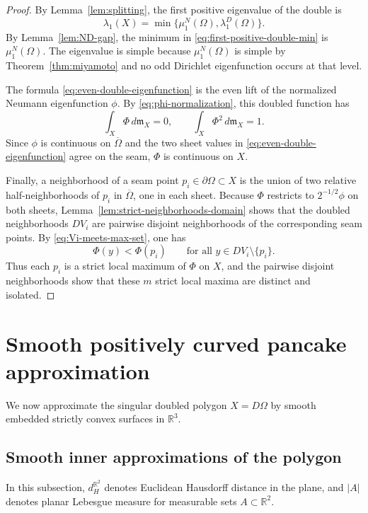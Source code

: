 \documentclass[11pt]{amsart}
\numberwithin{equation}{section}
\newcommand{\R}{\mathbb R}
\newcommand{\Om}{\Omega}
\newcommand{\mm}{\mathfrak m}
\begin{document}
\begin{proof}
By Lemma~\ref{lem:splitting}, the first positive eigenvalue of the double is
\begin{equation}\label{eq:first-positive-double-min}
\lambda_1(X)=\min\{\mu_1^N(\Om),\lambda_1^D(\Om)\}.
\end{equation}
By Lemma~\ref{lem:ND-gap}, the minimum in \eqref{eq:first-positive-double-min} is
$\mu_1^N(\Om)$.  The eigenvalue is simple because $\mu_1^N(\Om)$ is simple by
Theorem~\ref{thm:miyamoto} and no odd Dirichlet eigenfunction occurs at that
level.

The formula \eqref{eq:even-double-eigenfunction} is the even lift of the
normalized Neumann eigenfunction $\phi$.  By \eqref{eq:phi-normalization}, this
doubled function has
$$
\int_X\Phi\,d\mm_X=0,
\qquad
\int_X\Phi^2\,d\mm_X=1.
$$
Since $\phi$ is continuous on $\overline\Om$ and the two sheet values in
\eqref{eq:even-double-eigenfunction} agree on the seam, $\Phi$ is continuous on
$X$.

Finally, a neighborhood of a seam point $p_i\in\partial\Om\subset X$ is the union
of two relative half-neighborhoods of $p_i$ in $\overline\Om$, one in each sheet.
Because $\Phi$ restricts to $2^{-1/2}\phi$ on both sheets,
Lemma~\ref{lem:strict-neighborhoods-domain} shows that the doubled neighborhoods
$DV_i$ are pairwise disjoint neighborhoods of the corresponding seam points.  By
\eqref{eq:Vi-meets-max-set}, one has
$$
\Phi(y)<\Phi(p_i)
\qquad\text{for all }y\in D V_i\setminus\{p_i\}.
$$
Thus each $p_i$ is a strict local maximum of $\Phi$ on $X$, and the pairwise
disjoint neighborhoods show that these $m$ strict local maxima are distinct and
isolated.
\end{proof}

\section{Smooth positively curved pancake approximation}\label{sec:pancakes}

We now approximate the singular doubled polygon $X=D\Om$ by smooth embedded
strictly convex surfaces in $\R^3$.

\subsection{Smooth inner approximations of the polygon}

In this subsection, $d_H^{\R^2}$ denotes Euclidean Hausdorff distance in the
plane, and $|A|$ denotes planar Lebesgue measure for measurable sets
$A\subset\R^2$.
\end{document}

